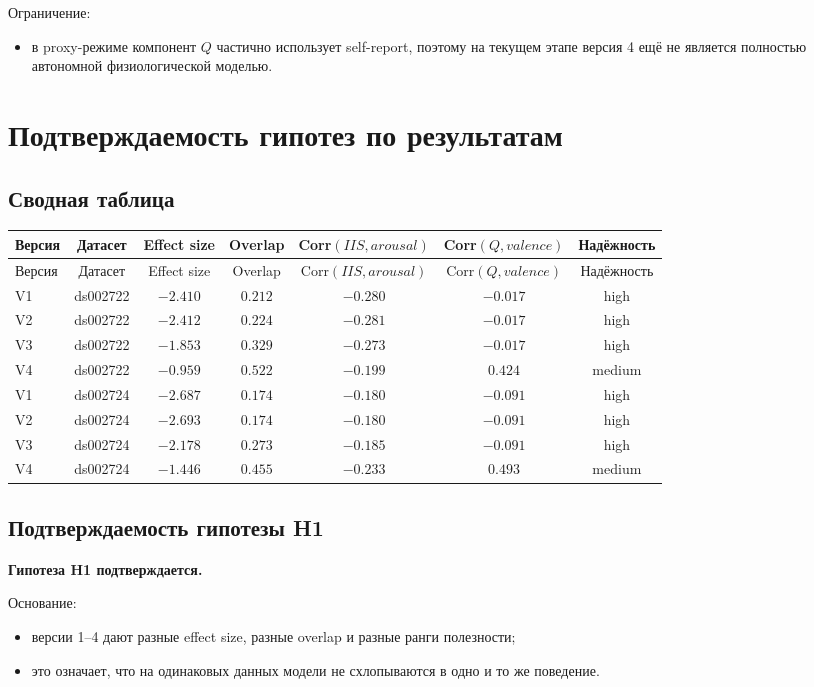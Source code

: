 \documentclass[12pt,a4paper]{article}
\begin{document}
Ограничение:
\begin{itemize}[leftmargin=1.25cm]
    \item в proxy-режиме компонент $Q$ частично использует self-report, поэтому на текущем этапе версия 4 ещё не является полностью автономной физиологической моделью.
\end{itemize}

\section{Подтверждаемость гипотез по результатам}
\subsection{Сводная таблица}
\begin{longtable}{>{\raggedright\arraybackslash}p{2.7cm}cccccc}
\toprule
Версия & Датасет & Effect size & Overlap & Corr$(IIS, arousal)$ & Corr$(Q, valence)$ & Надёжность \\
\midrule
\endfirsthead
\toprule
Версия & Датасет & Effect size & Overlap & Corr$(IIS, arousal)$ & Corr$(Q, valence)$ & Надёжность \\
\midrule
\endhead
V1 & ds002722 & $-2.410$ & $0.212$ & $-0.280$ & $-0.017$ & high \\
V2 & ds002722 & $-2.412$ & $0.224$ & $-0.281$ & $-0.017$ & high \\
V3 & ds002722 & $-1.853$ & $0.329$ & $-0.273$ & $-0.017$ & high \\
V4 & ds002722 & $-0.959$ & $0.522$ & $-0.199$ & $0.424$ & medium \\
\midrule
V1 & ds002724 & $-2.687$ & $0.174$ & $-0.180$ & $-0.091$ & high \\
V2 & ds002724 & $-2.693$ & $0.174$ & $-0.180$ & $-0.091$ & high \\
V3 & ds002724 & $-2.178$ & $0.273$ & $-0.185$ & $-0.091$ & high \\
V4 & ds002724 & $-1.446$ & $0.455$ & $-0.233$ & $0.493$ & medium \\
\bottomrule
\end{longtable}

\subsection{Подтверждаемость гипотезы H1}
\textbf{Гипотеза H1 подтверждается.}

Основание:
\begin{itemize}[leftmargin=1.25cm]
    \item версии 1--4 дают разные effect size, разные overlap и разные ранги полезности;
    \item это означает, что на одинаковых данных модели не схлопываются в одно и то же поведение.
\end{itemize}
\end{document}
